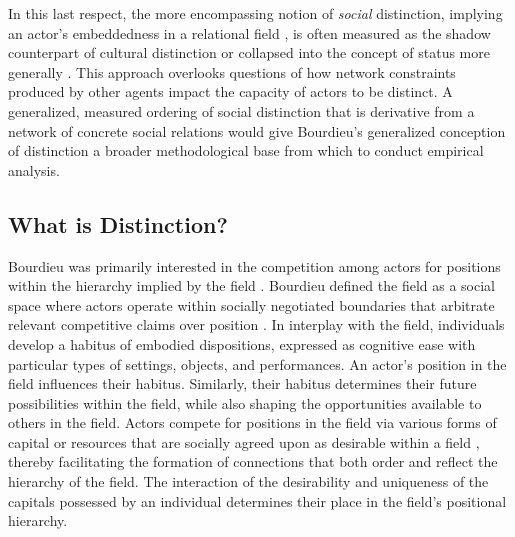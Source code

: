 \documentclass[12pt]{article}
\begin{document}
In this last respect, the more encompassing notion of \textit{social} distinction, implying an actor's embeddedness in a relational field \citep{erikson2013formalist-400, fuhse2021social-9cb}, is often measured as the shadow counterpart of cultural distinction or collapsed into the concept of status more generally \citep{podolny2010status-1a6}. This approach overlooks questions of how network constraints produced by other agents impact the capacity of actors to be distinct. A generalized, measured ordering of social distinction that is derivative from a network of concrete social relations would give Bourdieu's generalized conception of distinction a broader methodological base from which to conduct empirical analysis. 

\subsection{What is Distinction?}
Bourdieu was primarily interested in the competition among actors for positions within the hierarchy implied by the field \citep{anheier1995forms, bourdieu1993field-8ad}. Bourdieu defined the field as a social space where actors operate within socially negotiated boundaries that arbitrate relevant competitive claims over position \citep{bourdieu1996rules-393}. In interplay with the field, individuals develop a habitus of embodied dispositions, expressed as cognitive ease with particular types of settings, objects, and performances. An actor's position in the field influences their habitus. Similarly, their habitus determines their future possibilities within the field, while also shaping the opportunities available to others in the field. Actors compete for positions in the field via various forms of capital or resources that are socially agreed upon as desirable within a field \citep{martin2003field}, thereby facilitating the formation of connections that both order and reflect the hierarchy of the field. The interaction of the desirability and uniqueness of the capitals possessed by an individual determines their place in the field's positional hierarchy.   
\end{document}
